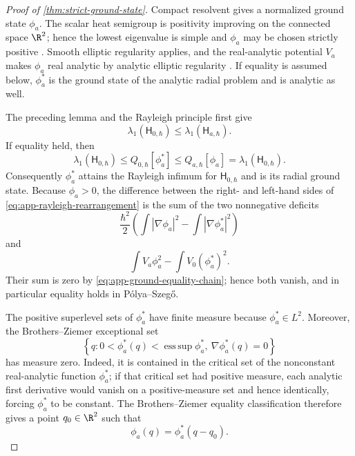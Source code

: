 \begin{proof}[Proof of \cref{thm:strict-ground-state}]
Compact resolvent gives a normalized ground state \(\phi_a\).  The scalar
heat semigroup is positivity improving on the connected space \(\R^2\);
hence the lowest eigenvalue is simple and \(\phi_a\) may be chosen strictly
positive \citep{ReedSimon1978IV}.  Smooth elliptic regularity applies, and
the real-analytic potential \(V_a\) makes \(\phi_a\) real analytic by
analytic elliptic regularity \citep{MorreyNirenberg1957}.  If equality is
assumed below, \(\phi_a^*\) is the ground state of the analytic radial
problem and is analytic as well.

The preceding lemma and the Rayleigh principle first give
\begin{equation}
 \lambda_1(\mathsf H_{0,\hbar})
 \le\lambda_1(\mathsf H_{a,\hbar}).
\end{equation}
If equality held, then
\begin{equation}
 \lambda_1(\mathsf H_{0,\hbar})
 \le Q_{0,\hbar}[\phi_a^*]
 \le Q_{a,\hbar}[\phi_a]
 =\lambda_1(\mathsf H_{0,\hbar}).
 \label{eq:app-ground-equality-chain}
\end{equation}
Consequently \(\phi_a^*\) attains the Rayleigh infimum for
\(\mathsf H_{0,\hbar}\) and is its radial ground state.  Because
\(\phi_a>0\), the difference between the right- and left-hand sides of
\cref{eq:app-rayleigh-rearrangement} is the sum of the two nonnegative
deficits
\begin{equation}
 \frac{\hbar^2}{2}\left(
 \int|\nabla\phi_a|^2-\int|\nabla\phi_a^*|^2\right)
 \label{eq:app-kinetic-deficit}
\end{equation}
and
\begin{equation}
 \int V_a\phi_a^2-\int V_0(\phi_a^*)^2.
 \label{eq:app-potential-deficit}
\end{equation}
Their sum is zero by \cref{eq:app-ground-equality-chain}; hence both vanish,
and in particular equality holds in P\'olya--Szeg\H{o}.

The positive superlevel sets of \(\phi_a^*\) have finite measure because
\(\phi_a^*\in L^2\).  Moreover, the Brothers--Ziemer exceptional set
\begin{equation}
 \left\{q:0<\phi_a^*(q)<\operatorname*{ess\,sup}\phi_a^*,\ 
 \nabla\phi_a^*(q)=0\right\}
 \label{eq:app-bz-exceptional-set}
\end{equation}
has measure zero.  Indeed, it is contained in the critical set of the
nonconstant real-analytic function \(\phi_a^*\); if that critical set had
positive measure, each analytic first derivative would vanish on a
positive-measure set and hence identically, forcing \(\phi_a^*\) to be
constant.  The Brothers--Ziemer equality classification therefore gives a
point \(q_0\in\R^2\) such that
\begin{equation}
 \phi_a(q)=\phi_a^*(q-q_0).
 \label{eq:app-ground-translate}
\end{equation}


\end{proof}
